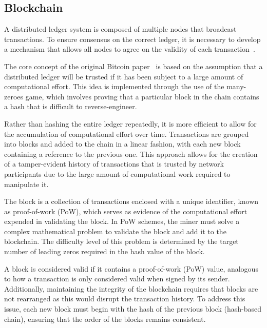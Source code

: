 \subsection{Blockchain}
A distributed ledger system is composed of multiple nodes that broadcast transactions. To ensure consensus on the
correct ledger, it is necessary to develop a mechanism that allows all nodes to agree on the validity of each
transaction~\cite{el2018review}.

The core concept of the original Bitcoin paper~\cite{nakamoto2008bitcoin} is based on the assumption that a distributed
ledger will be trusted if it has been subject to a large amount of computational effort. This idea is implemented
through the use of the many-zeroes game, which involves proving that a particular block in the chain contains a hash
that is difficult to reverse-engineer.

Rather than hashing the entire ledger repeatedly, it is more efficient to allow for the accumulation of computational
effort over time. Transactions are grouped into blocks and added to the chain in a linear fashion, with each new block
containing a reference to the previous one. This approach allows for the creation of a tamper-evident history of
transactions that is trusted by network participants due to the large amount of computational work required to
manipulate it.

%

The block is a collection of transactions enclosed with a unique identifier, known as proof-of-work (PoW), which serves
as evidence of the computational effort expended in validating the block. In PoW schemes, the miner must solve a complex
mathematical problem to validate the block and add it to the blockchain. The difficulty level of this problem is
determined by the target number of leading zeros required in the hash value of the block.

%

A block is considered valid if it contains a proof-of-work (PoW) value, analogous to how a transaction is only
considered valid when signed by its sender. Additionally, maintaining the integrity of the blockchain requires that
blocks are not rearranged as this would disrupt the transaction history. To address this issue, each new block must
begin with the hash of the previous block (hash-based chain), ensuring that the order of the blocks remains consistent.




